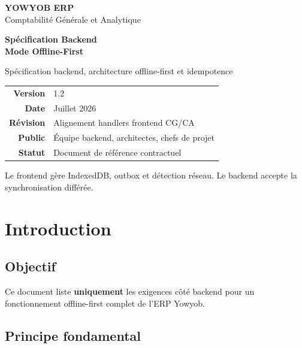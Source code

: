 \documentclass[12pt,a4paper]{report}
\begin{document}
\begin{titlepage}
  \centering
  \vspace*{2cm}
  {\LARGE\textbf{YOWYOB ERP}\\[0.4em]Comptabilité Générale et Analytique\par}
  \vspace{1.8cm}
  {\Huge\textbf{Spécification Backend\\[0.35em]Mode Offline-First}\par}
  \vspace{1.2cm}
  {\large Spécification backend, architecture offline-first et idempotence\par}
  \vspace{2.2cm}
  \begin{tabular}{rl}
    \textbf{Version} & 1.2 \\
    \textbf{Date} & Juillet 2026 \\
    \textbf{Révision} & Alignement handlers frontend CG/CA \\
    \textbf{Public} & Équipe backend, architectes, chefs de projet \\
    \textbf{Statut} & Document de référence contractuel \\
  \end{tabular}
  \vfill
  {\small Le frontend gère IndexedDB, outbox et détection réseau. Le backend accepte la synchronisation différée.\par}
\end{titlepage}

\tableofcontents
\newpage

\chapter{Introduction}

\section{Objectif}

Ce document liste \textbf{uniquement} les exigences côté backend pour un fonctionnement offline-first complet de l'ERP Yowyob.

\section{Principe fondamental}
\end{document}
